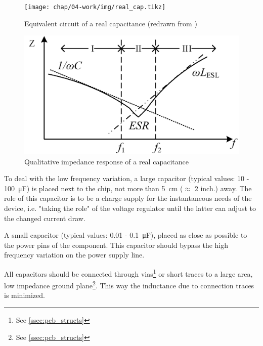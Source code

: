 \tikzexternaldisable
\begin{figure}[tbh]
	\centering
	\texttt{[image: chap/04-work/img/real\_cap.tikz]}
	\caption[Capacitor equivalent circuit]{Equivalent circuit of a real capacitance (redrawn from \cite{decouple})}
	\label{fig:real_cap}
\end{figure}
\tikzexternalenable
\begin{figure}[tbh]
	\centering
	\includegraphics[width = \textwidth]{chap/04-work/img/esl_esr}
	\caption[Impedance response of a real capacitor]{Qualitative impedance response of a real capacitance \cite{Dang2020}}
	\label{fig:esl_esr}
\end{figure}


To deal with the low frequency variation, a large capacitor (typical values: 10 - \SI{100}{\micro \farad}) is placed next to the chip, not more than \SI{5}{\centi \metre} ($\approx$ 2 inch.) away.
The role of this capacitor is to be a charge supply for the instantaneous needs of the device, i.e. "taking the role" of the voltage regulator until the latter can adjust to the changed current draw. \cite{decouple}

A small capacitor (typical values: 0.01 - \SI{0.1}{\micro \farad}), placed as close as possible to the power pins of the component.
This capacitor should bypass the high frequency variation on the power supply line. \cite{decouple}

All capacitors should be connected through vias\footnote{See \autoref{ssec:pcb_structs}} or short traces to a large area, low impedance ground plane\footnote{See \autoref{ssec:pcb_structs}}. %
This way the inductance due to connection traces is minimized. \cite{decouple}

